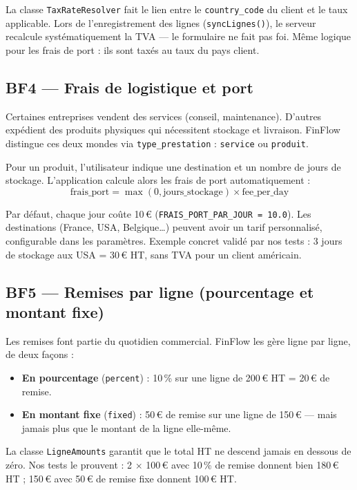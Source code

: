\documentclass[12pt,a4paper]{report}
\begin{document}
La classe \texttt{TaxRateResolver} fait le lien entre le \texttt{country\_code} du client et le taux applicable. Lors de l'enregistrement des lignes (\texttt{syncLignes()}), le serveur recalcule systématiquement la TVA --- le formulaire ne fait pas foi. Même logique pour les frais de port : ils sont taxés au taux du pays client.

\subsection{BF4 — Frais de logistique et port}

Certaines entreprises vendent des services (conseil, maintenance). D'autres expédient des produits physiques qui nécessitent stockage et livraison. FinFlow distingue ces deux mondes via \texttt{type\_prestation} : \texttt{service} ou \texttt{produit}.

Pour un produit, l'utilisateur indique une destination et un nombre de jours de stockage. L'application calcule alors les frais de port automatiquement :
\[
\text{frais\_port} = \max(0, \text{jours\_stockage}) \times \text{fee\_per\_day}
\]

Par défaut, chaque jour coûte 10\,€ (\texttt{FRAIS\_PORT\_PAR\_JOUR = 10.0}). Les destinations (France, USA, Belgique\ldots) peuvent avoir un tarif personnalisé, configurable dans les paramètres. Exemple concret validé par nos tests : 3 jours de stockage aux USA = 30\,€ HT, sans TVA pour un client américain.

\subsection{BF5 — Remises par ligne (pourcentage et montant fixe)}

Les remises font partie du quotidien commercial. FinFlow les gère ligne par ligne, de deux façons :
\begin{itemize}[leftmargin=*]
    \item \textbf{En pourcentage} (\texttt{percent}) : 10\,\% sur une ligne de 200\,€ HT = 20\,€ de remise.
    \item \textbf{En montant fixe} (\texttt{fixed}) : 50\,€ de remise sur une ligne de 150\,€ --- mais jamais plus que le montant de la ligne elle-même.
\end{itemize}
La classe \texttt{LigneAmounts} garantit que le total HT ne descend jamais en dessous de zéro. Nos tests le prouvent : 2 $\times$ 100\,€ avec 10\,\% de remise donnent bien 180\,€ HT ; 150\,€ avec 50\,€ de remise fixe donnent 100\,€ HT.
\end{document}
